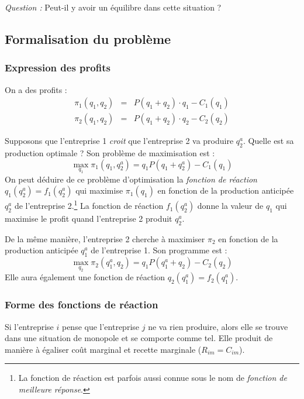 \documentclass[
]{book}
\theoremstyle{definition}
\theoremstyle{definition}
\theoremstyle{definition}
\theoremstyle{definition}
\theoremstyle{remark}
\begin{document}
\emph{Question :} Peut-il y avoir un équilibre dans cette situation ?

\hypertarget{formalisation-du-probluxe8me}{%
\subsection{Formalisation du problème}\label{formalisation-du-probluxe8me}}

\hypertarget{expression-des-profits}{%
\subsubsection{Expression des profits}\label{expression-des-profits}}

On a des profits :
\[
\begin{array}{rcl}
\pi_1(q_1, q_2) &=& P(q_1+q_2)\cdot q_1-C_1(q_1)\\
\pi_2(q_1, q_2) &=& P(q_1+q_2)\cdot q_2-C_2(q_2)
\end{array}
\label{eq:profitcournot}
\]

Supposons que l'entreprise 1 \emph{croit} que l'entreprise 2 va produire \(q_2^a\).
Quelle est sa production optimale ?
Son problème de maximisation est :
\[
\max_{q_1} \pi_1(q_1, q_2^a) =  q_1P(q_1+q_2^a)-C_1(q_1)
\]
On peut déduire de ce problème d'optimisation la \emph{fonction de réaction} \(q_1(q_2^a)=f_1(q_2^a)\) qui maximise \(\pi_1(q_1)\) en fonction de la production anticipée \(q_2^a\) de l'entreprise 2.\footnote{La fonction de réaction est parfois aussi connue sous le nom de \emph{fonction de meilleure réponse}.}
La fonction de réaction \(f_1(q_2^a)\) donne la valeur de \(q_1\) qui maximise le profit quand l'entreprise 2 produit \(q_2^a\).

De la même manière, l'entreprise 2 cherche à maximiser \(\pi_2\) en fonction de la production anticipée \(q_1^a\) de l'entreprise 1.
Son programme est :
\[
\max_{q_2} \pi_2(q_1^a, q_2) =  q_1P(q_1^a+q_2)-C_2(q_2)
\]
Elle aura également une fonction de réaction \(q_2(q_1^a)=f_2(q_1^a)\).

\hypertarget{forme-des-fonctions-de-ruxe9action}{%
\subsubsection{Forme des fonctions de réaction}\label{forme-des-fonctions-de-ruxe9action}}

Si l'entreprise \(i\) pense que l'entreprise \(j\) ne va rien produire, alors elle se trouve dans une situation de monopole et se comporte comme tel.
Elle produit de manière à égaliser coût marginal et recette marginale (\(R_{im}=C_{im}\)).
\end{document}
